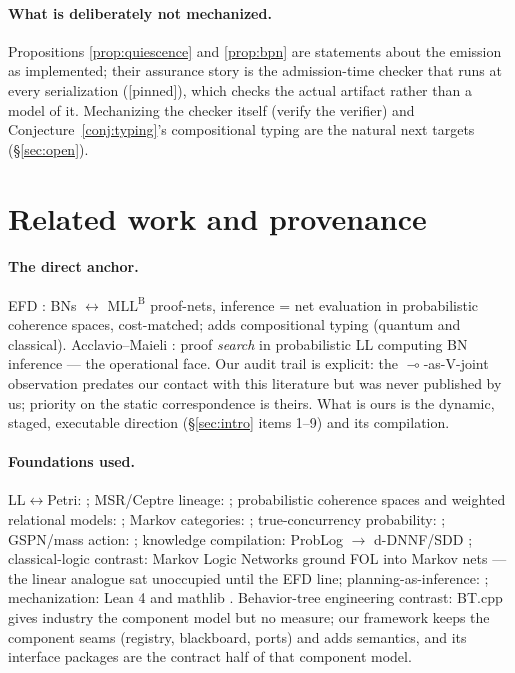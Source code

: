 \documentclass[11pt]{article}
\newcommand{\lolli}{\multimap}
\newcommand{\mllb}{\mathrm{MLL}^{\mathrm B}}
\newcommand{\stpinned}{[\textsf{pinned}]}
\theoremstyle{plain}
\theoremstyle{definition}
\theoremstyle{remark}
\begin{document}
\paragraph{What is deliberately not mechanized.} Propositions
\ref{prop:quiescence} and \ref{prop:bpn} are statements about the
emission as implemented; their assurance story is the admission-time
checker that runs at every serialization (\stpinned{}), which checks
the actual artifact rather than a model of it. Mechanizing the checker
itself (verify the verifier) and Conjecture~\ref{conj:typing}'s
compositional typing are the natural next targets
(\S\ref{sec:open}).

\section{Related work and provenance}\label{sec:related}

\paragraph{The direct anchor.} EFD \cite{EFD24,EFD26}: BNs
$\leftrightarrow$ $\mllb$ proof-nets, inference = net evaluation in
probabilistic coherence spaces, cost-matched; \cite{DEF26} adds
compositional typing (quantum and classical). Acclavio--Maieli
\cite{AM26}: proof \emph{search} in probabilistic LL computing BN
inference --- the operational face. Our audit trail is explicit: the
$\lolli$-as-V-joint observation predates our contact with this
literature but was never published by us; priority on the static
correspondence is theirs. What is ours is the dynamic, staged,
executable direction (\S\ref{sec:intro} items 1--9) and its
compilation.

\paragraph{Foundations used.} LL$\leftrightarrow$Petri:
\cite{GG89,EW93}; MSR/Ceptre lineage: \cite{CS09,Mar15,CLF};
probabilistic coherence spaces and weighted relational models:
\cite{Gir04,DE11,EPT18,LMMP13}; Markov categories: \cite{Fri20,CJ19};
true-concurrency probability: \cite{AB06,Win13,CCPW18,Paq21};
GSPN/mass action: \cite{Gil77,GSPN}; knowledge compilation: ProbLog
$\to$ d-DNNF/SDD \cite{FdB15,Dar11}; classical-logic contrast: Markov
Logic Networks \cite{RD06} ground FOL into Markov nets --- the linear
analogue sat unoccupied until the EFD line; planning-as-inference:
\cite{TS06,Lev18}; mechanization: Lean 4 \cite{MU21} and mathlib
\cite{mathlib20}. Behavior-tree engineering contrast: BT.cpp gives
industry the component model but no measure; our framework keeps the
component seams (registry, blackboard, ports) and adds semantics, and
its interface packages are the contract half of that component model.
\end{document}

